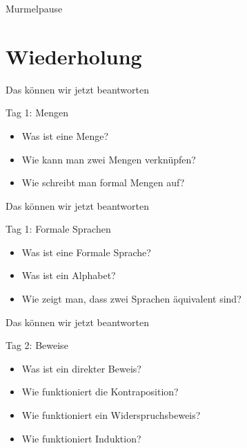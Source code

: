 

\begin{frame}[standout]
  Murmelpause
\end{frame}

\section{Wiederholung} 
\begin{frame}[fragile]{Das können wir jetzt beantworten}
	\begin{alertblock}{Tag 1: Mengen}
		\begin{itemize}
			\item Was ist eine Menge?
			\item Wie kann man zwei Mengen verknüpfen?
			\item Wie schreibt man formal Mengen auf?
		\end{itemize}
	\end{alertblock}
\end{frame}

\begin{frame}[fragile]{Das können wir jetzt beantworten}
	\begin{alertblock}{Tag 1: Formale Sprachen}
		\begin{itemize}
			\item Was ist eine Formale Sprache?
			\item Was ist ein Alphabet?
			\item Wie zeigt man, dass zwei Sprachen äquivalent sind?
		\end{itemize}
	\end{alertblock}
\end{frame}

\begin{frame}[fragile]{Das können wir jetzt beantworten}
    \begin{alertblock}{Tag 2: Beweise}
    \begin{itemize}
        \item Was ist ein direkter Beweis?
        \item Wie funktioniert die Kontraposition?
        \item Wie funktioniert ein Widerspruchsbeweis?
        \item Wie funktioniert Induktion?
    \end{itemize}
    \end{alertblock}
\end{frame}

